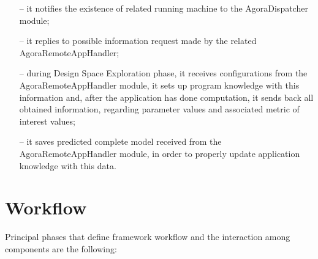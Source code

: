 \begin{enumerate}
\begin{itemize}
		\item [--] it notifies the existence of related running machine to the AgoraDispatcher module;

		\item [--] it replies to possible information request made by the related AgoraRemoteAppHandler;

		\item [--] during Design Space Exploration phase, it receives configurations from the AgoraRemoteAppHandler module, it sets up program knowledge with this information and, after the application has done computation, it sends back all obtained information, regarding parameter values and associated metric of interest values;

		\item [--] it saves predicted complete model received from the AgoraRemoteAppHandler module, in order to properly update application knowledge with this data.
	\end{itemize}

\end{enumerate}



\section{Workflow}

Principal phases that define framework workflow and the interaction among components are the following:

